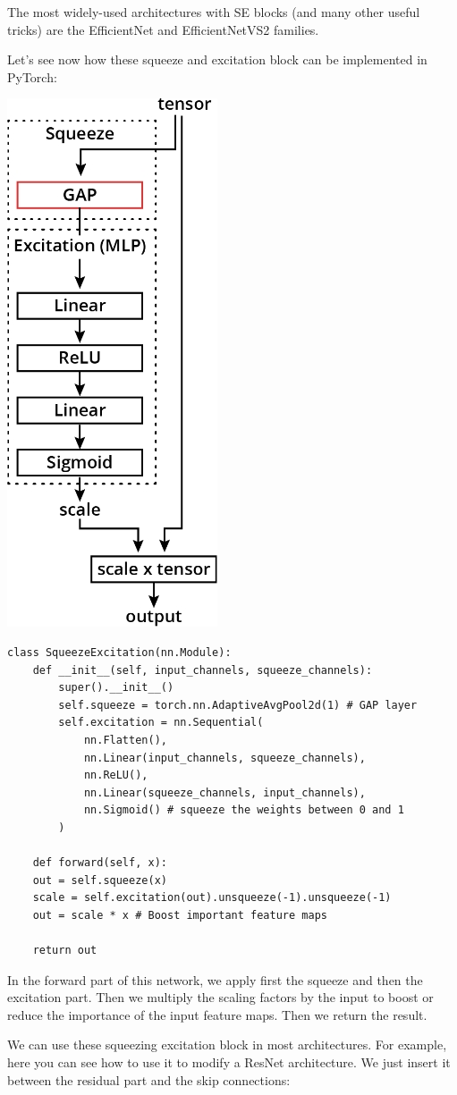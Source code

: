The most widely-used architectures with SE blocks (and many other useful tricks) are the EfficientNet and EfficientNetVS2 families.  \newline

Let's see now how these squeeze and excitation block can be implemented in PyTorch:

\includegraphics[width=0.25\linewidth]{img//cnn//transfer/se.jpeg}

\begin{lstlisting}
class SqueezeExcitation(nn.Module):
    def __init__(self, input_channels, squeeze_channels):
        super().__init__()
        self.squeeze = torch.nn.AdaptiveAvgPool2d(1) # GAP layer
        self.excitation = nn.Sequential(
            nn.Flatten(),
            nn.Linear(input_channels, squeeze_channels),
            nn.ReLU(),
            nn.Linear(squeeze_channels, input_channels),
            nn.Sigmoid() # squeeze the weights between 0 and 1
        )
    
    def forward(self, x):
    out = self.squeeze(x)
    scale = self.excitation(out).unsqueeze(-1).unsqueeze(-1)
    out = scale * x # Boost important feature maps

    return out
\end{lstlisting}
In the forward part of this network, we apply first the squeeze and then the excitation part. Then we multiply the scaling factors by the input to boost or reduce the importance of the input feature maps.
Then we return the result. \newline

We can use these squeezing excitation block in most architectures. For example, here you can see how to use it to modify a ResNet architecture. We just insert it between the residual part and the skip connections:


